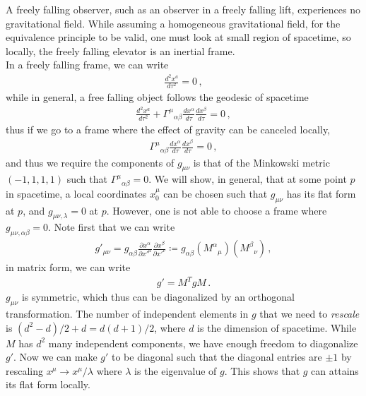 \documentclass[11pt, onesided]{book}
\theoremstyle{break}
\theoremstyle{break}
\newcommand{\pd}{\partial}
\begin{document}
A freely falling observer, such as an observer in a freely falling lift, experiences no gravitational field. While assuming a homogeneous gravitational field, for the equivalence principle to be valid, one must look at small region of spacetime, so locally, the freely falling elevator is an inertial frame. \\

In a freely falling frame, we can write
\begin{align*}
\frac{d^2x^a}{d\tau^2} = 0\,,
\end{align*}
while in general, a free falling object follows the geodesic of spacetime
\begin{align*}
\frac{d^2 x^a}{d\tau^2} + \Gamma^{\mu}{}_{\alpha\beta} \frac{dx^\alpha}{d\tau}\frac{dx^\beta}{d\tau} = 0\,,
\end{align*}
thus if we go to a frame where the effect of gravity can be canceled locally,
\begin{align*}
\Gamma^{\mu}{}_{\alpha\beta} \frac{dx^\alpha}{d\tau}\frac{dx^\beta}{d\tau} = 0\,,
\end{align*}
and thus we require the components of $g_{\mu\nu}$ is that of the Minkowski metric $(-1,1,1,1)$ such that $\Gamma^\mu{}_{\alpha\beta} = 0$. We will show, in general, that at some point $p$ in spacetime, a local coordinates $x_0^\mu$ can be chosen such that $g_{\mu\nu}$ has its flat form at $p$, and $g_{\mu\nu,\lambda} = 0$ at $p$. However, one is not able to choose a frame where $g_{\mu\nu,\alpha\beta} = 0$. Note first that we can write
\begin{align*}
g'_{\mu\nu} = g_{\alpha\beta}\frac{\pd x^\alpha}{\pd x'^\mu}\frac{\pd x^\beta}{\pd x'^\nu} \coloneqq g_{\alpha\beta} (M^\alpha{}_\mu) (M^\beta{}_\nu)\,,
\end{align*}
in matrix form, we can write
\begin{align*}
g' = M^T gM\,.
\end{align*}
$g_{\mu\nu}$ is symmetric, which thus can be diagonalized by an orthogonal transformation. The number of independent elements in $g$ that we need to \textit{rescale} is $(d^2 -d)/2+d = d(d+1)/2$, where $d$ is the dimension of spacetime. While $M$ has $d^2$ many independent components, we have enough freedom to diagonalize $g'$. Now we can make $g'$ to be diagonal such that the diagonal entries are $\pm 1$ by rescaling $x^\mu \to x^\mu/\lambda$ where $\lambda$ is the eigenvalue of $g$. This shows that $g$ can attains its flat form locally.\\
\end{document}
